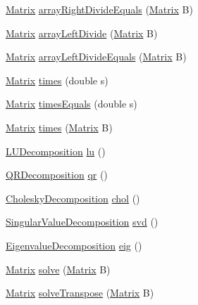 \begin{DoxyCompactItemize}
\hyperlink{class_jama_1_1_matrix}{Matrix} \hyperlink{class_jama_1_1_matrix_a406e5df159235779a4daf8c7f03d99f4}{array\+Right\+Divide\+Equals} (\hyperlink{class_jama_1_1_matrix}{Matrix} B)
\item 
\hyperlink{class_jama_1_1_matrix}{Matrix} \hyperlink{class_jama_1_1_matrix_a91d7f43868ad45441582d84737717310}{array\+Left\+Divide} (\hyperlink{class_jama_1_1_matrix}{Matrix} B)
\item 
\hyperlink{class_jama_1_1_matrix}{Matrix} \hyperlink{class_jama_1_1_matrix_a6b15989d8788a7d8b1c009f2050df4c6}{array\+Left\+Divide\+Equals} (\hyperlink{class_jama_1_1_matrix}{Matrix} B)
\item 
\hyperlink{class_jama_1_1_matrix}{Matrix} \hyperlink{class_jama_1_1_matrix_a501121f9faae04f5814a37173e8c186e}{times} (double s)
\item 
\hyperlink{class_jama_1_1_matrix}{Matrix} \hyperlink{class_jama_1_1_matrix_ad05d4023973768f684fffb7726c5c0c7}{times\+Equals} (double s)
\item 
\hyperlink{class_jama_1_1_matrix}{Matrix} \hyperlink{class_jama_1_1_matrix_ab3de28682fee833a5debb00c68503fe2}{times} (\hyperlink{class_jama_1_1_matrix}{Matrix} B)
\item 
\hyperlink{class_jama_1_1_l_u_decomposition}{L\+U\+Decomposition} \hyperlink{class_jama_1_1_matrix_ac20a6210f706179230357e59a92102bd}{lu} ()
\item 
\hyperlink{class_jama_1_1_q_r_decomposition}{Q\+R\+Decomposition} \hyperlink{class_jama_1_1_matrix_a71278074f6e76a762631b1919aaa4500}{qr} ()
\item 
\hyperlink{class_jama_1_1_cholesky_decomposition}{Cholesky\+Decomposition} \hyperlink{class_jama_1_1_matrix_aa8318d703898bcdad10235bf23566f2e}{chol} ()
\item 
\hyperlink{class_jama_1_1_singular_value_decomposition}{Singular\+Value\+Decomposition} \hyperlink{class_jama_1_1_matrix_a64d5b9b2faf9ee4f3fedfcc6423f7706}{svd} ()
\item 
\hyperlink{class_jama_1_1_eigenvalue_decomposition}{Eigenvalue\+Decomposition} \hyperlink{class_jama_1_1_matrix_ae54e821d5f2dd44734e14d8336f3ca9f}{eig} ()
\item 
\hyperlink{class_jama_1_1_matrix}{Matrix} \hyperlink{class_jama_1_1_matrix_a33aeb09e6d0099145841c9d6f82e0576}{solve} (\hyperlink{class_jama_1_1_matrix}{Matrix} B)
\item 
\hyperlink{class_jama_1_1_matrix}{Matrix} \hyperlink{class_jama_1_1_matrix_aac324c690f00efc5b6a1769d10a79722}{solve\+Transpose} (\hyperlink{class_jama_1_1_matrix}{Matrix} B)

\end{DoxyCompactItemize}

